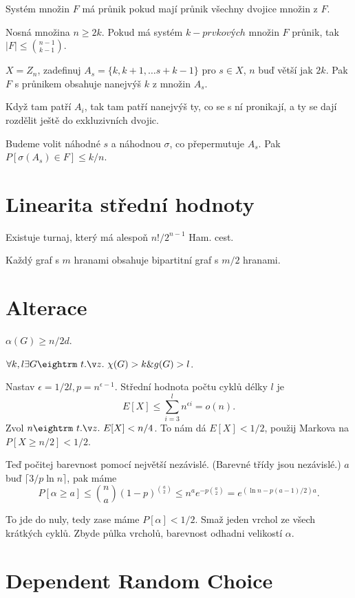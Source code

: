 \dfn Systém množin $F$ {\I má průnik} pokud mají průnik všechny dvojice množin z $F$.

 Nosná množina $n \ge 2k$. Pokud má systém
$k-prvkových$ množin $F$ průnik, tak $|F| \le {n-1 \choose k-1}$.

\lem{} $X = Z_n$, zadefinuj $A_s = \{k,k+1,\dots s+k-1\}$ pro $s \in X$, $n$ buď
větší jak $2k$.  Pak $F$ s průnikem obsahuje nanejvýš $k$ z množin $A_s$.

\prf{} Když tam patří $A_i$, tak tam patří nanejvýš ty, co se s ní pronikají, a
ty se dají rozdělit ještě do exkluzivních dvojic.

 Budeme volit náhodné $s$ a náhodnou $\sigma$, co přepermutuje
$A_s$. Pak $P[\sigma(A_s) \in F] \le k/n$.

\section{Linearita střední hodnoty}

\thm{} Existuje turnaj, který má alespoň $n!/2^{n-1}$ Ham. cest.

\thm{} Každý graf s $m$ hranami obsahuje bipartitní graf s $m/2$ hranami.

\section{Alterace}

 $\alpha(G) \ge n/2d$.

\prf{}

 $\forall k,l \exists G \st \chi(G) > k \& g(G) > l$.

\prf{} Nastav $\epsilon = 1/2l, p = n^{\epsilon-1}$. Střední hodnota počtu cyklů
délky $l$ je $$E[X] \le \sum_{i=3}^l n^{\epsilon i} = o(n).$$
Zvol $n \st E[X] < n/4$. To nám dá $E[X] < 1/2$, použij Markova na $P[X \ge n/2] < 1/2$.

Teď počitej barevnost pomocí největší nezávislé. (Barevné třídy jsou
nezávislé.) $a$ buď $\lceil 3/p \ln n \rceil$, pak máme
$$P[\alpha \ge a] \le {n \choose a} (1-p)^{{a \choose 2}} \le n^a e^{-p{a \choose 2}} =
e^{(\ln n -p(a-1)/2)a}.$$

To jde do nuly, tedy zase máme $P[\alpha] < 1/2$. Smaž jeden vrchol ze všech krátkých cyklů.
Zbyde půlka vrcholů, barevnost odhadni velikostí $\alpha$.

\section{Dependent Random Choice}

